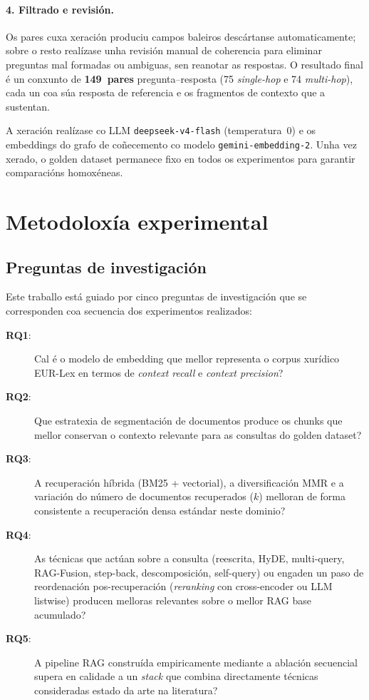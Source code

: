\documentclass[11pt, a4paper, oneside]{report}
\begin{document}
\paragraph{4. Filtrado e revisión.} Os pares cuxa xeración produciu campos baleiros
descártanse automaticamente; sobre o resto realízase unha revisión manual de
coherencia para eliminar preguntas mal formadas ou ambiguas, sen reanotar as
respostas. O resultado final é un conxunto de \textbf{149~pares} pregunta--resposta
(75 \textit{single-hop} e 74 \textit{multi-hop}), cada un coa súa resposta de
referencia e os fragmentos de contexto que a sustentan.

A xeración realízase co LLM \texttt{deepseek-v4-flash} (temperatura~0) e os embeddings
do grafo de coñecemento co modelo \texttt{gemini-embedding-2}. Unha vez xerado, o
golden dataset permanece fixo en todos os experimentos para garantir comparacións
homoxéneas.

\section{Metodoloxía experimental}
\label{sec:metodoloxia}

\subsection{Preguntas de investigación}
\label{sec:rqs}

Este traballo está guiado por cinco preguntas de investigación que se corresponden
coa secuencia dos experimentos realizados:

\begin{description}
  \item[\textbf{RQ1}:] Cal é o modelo de embedding que mellor representa o corpus
    xurídico EUR-Lex en termos de \textit{context recall} e \textit{context precision}?
  \item[\textbf{RQ2}:] Que estratexia de segmentación de documentos produce os chunks
    que mellor conservan o contexto relevante para as consultas do golden dataset?
  \item[\textbf{RQ3}:] A recuperación híbrida (BM25 + vectorial), a diversificación
    \ac{MMR} e a variación do número de documentos recuperados ($k$) melloran de forma
    consistente a recuperación densa estándar neste dominio?
  \item[\textbf{RQ4}:] As técnicas que actúan sobre a consulta (reescrita, HyDE,
    multi-query, RAG-Fusion, step-back, descomposición, self-query) ou engaden un paso
    de reordenación pos-recuperación (\textit{reranking} con cross-encoder ou LLM
    listwise) producen melloras relevantes sobre o mellor RAG base acumulado?
  \item[\textbf{RQ5}:] A pipeline RAG construída empiricamente mediante a ablación
    secuencial supera en calidade a un \textit{stack} que combina directamente técnicas
    consideradas estado da arte na literatura?
\end{description}
\end{document}
